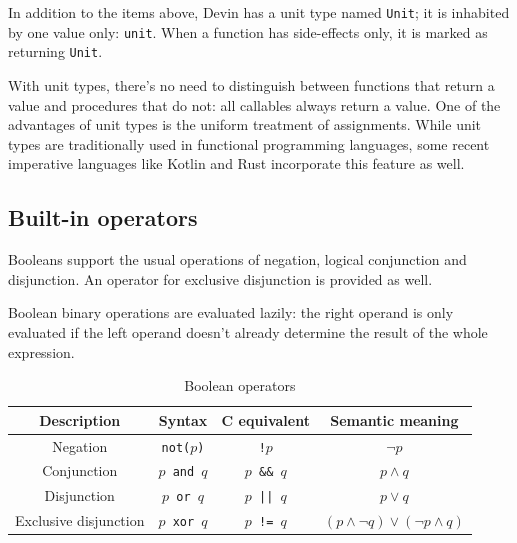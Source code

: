 \documentclass[UdineBachThesis,american,11pt]{PhdThesis}
\begin{document}
  In addition to the items above, Devin has a unit type named
  \mbox{\texttt{Unit}}; it is inhabited by one value only: \mbox{\texttt{unit}}.
  When a function has side-effects only, it is marked as returning
  \mbox{\texttt{Unit}}.

  With unit types, there's no need to distinguish between functions that return
  a value and procedures that do not: all callables always return a value. One
  of the advantages of unit types is the uniform treatment of assignments. While
  unit types are traditionally used in functional programming languages, some
  recent imperative languages like Kotlin and Rust incorporate this feature as
  well.

  \subsection{Built-in operators}

  Booleans support the usual operations of negation, logical conjunction and
  disjunction. An operator for exclusive disjunction is provided as well.

  Boolean binary operations are evaluated lazily: the right operand is only
  evaluated if the left operand doesn't already determine the result of the
  whole expression.

  \begin{table}[H]
    \centering

    \begin{tabular}{|c|c|c|c|}
      \hline

      Description &
      Syntax &
      C equivalent &
      Semantic meaning \\
      \hline

      Negation &
      \texttt{not($p$)} &
      \texttt{!$p$} &
      $\lnot p$ \\

      Conjunction &
      \texttt{$p$ and $q$} &
      \texttt{$p$ \&\& $q$} &
      $p \land q$ \\

      Disjunction &
      \texttt{$p$ or $q$} &
      \texttt{$p$ || $q$} &
      $p \lor q$ \\

      Exclusive disjunction &
      \texttt{$p$ xor $q$} &
      \texttt{$p$ != $q$} &
      $\left(p \land \lnot q\right) \lor \left(\lnot p \land q\right)$ \\
      \hline
    \end{tabular}

    \caption{Boolean operators}
  \end{table}
\end{document}
